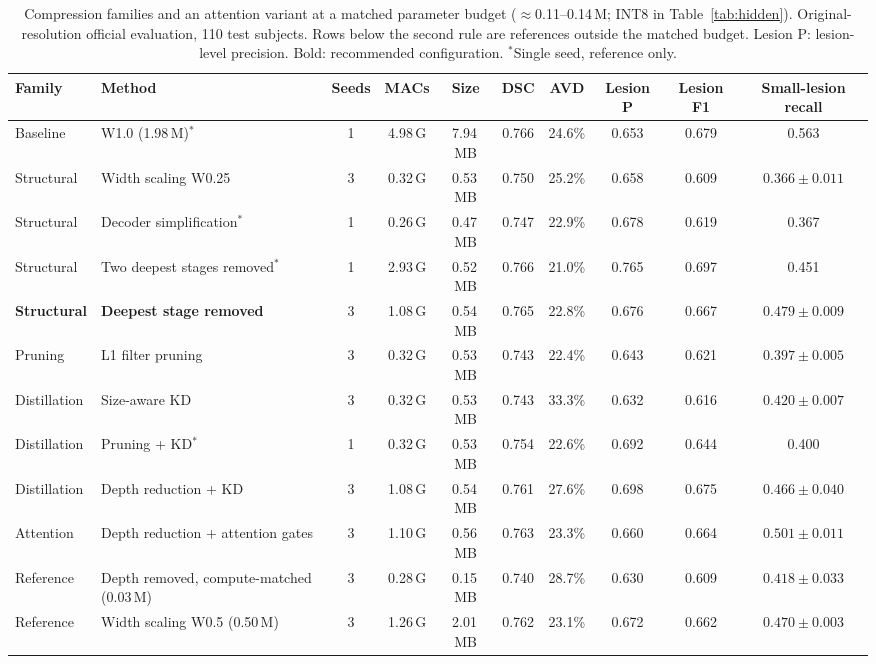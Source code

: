 \documentclass[conference]{IEEEtran}
\begin{document}
\begin{table}[t]
\caption{Compression families and an attention variant at a matched
parameter budget ($\approx$0.11--0.14\,M; INT8 in Table~\ref{tab:hidden}). Original-resolution official evaluation, 110 test
subjects. Rows below the second rule are references outside the matched
budget. Lesion P: lesion-level precision. Bold: recommended configuration. $^{*}$Single seed, reference only.}
\label{tab:main}
\centering
\footnotesize
\setlength{\tabcolsep}{4pt}
\begin{tabular}{llcccccccc}
\toprule
Family & Method & Seeds & MACs & Size & DSC & AVD & Lesion P & Lesion F1 & Small-lesion recall \\
\midrule
Baseline & W1.0 (1.98\,M)$^{*}$ & 1 & 4.98\,G & 7.94\,MB & 0.766 & 24.6\% & 0.653 & 0.679 & 0.563 \\
\midrule
Structural & Width scaling W0.25 & 3 & 0.32\,G & 0.53\,MB & 0.750 & 25.2\% & 0.658 & 0.609 & $0.366 \pm 0.011$ \\
Structural & Decoder simplification$^{*}$ & 1 & 0.26\,G & 0.47\,MB & 0.747 & 22.9\% & 0.678 & 0.619 & 0.367 \\
Structural & Two deepest stages removed$^{*}$ & 1 & 2.93\,G & 0.52\,MB & 0.766 & 21.0\% & 0.765 & 0.697 & 0.451 \\
\textbf{Structural} & \textbf{Deepest stage removed} & 3 & 1.08\,G & 0.54\,MB & 0.765 & 22.8\% & 0.676 & 0.667 & $0.479 \pm 0.009$ \\
Pruning & L1 filter pruning & 3 & 0.32\,G & 0.53\,MB & 0.743 & 22.4\% & 0.643 & 0.621 & $0.397 \pm 0.005$ \\
Distillation & Size-aware KD & 3 & 0.32\,G & 0.53\,MB & 0.743 & 33.3\% & 0.632 & 0.616 & $0.420 \pm 0.007$ \\
Distillation & Pruning + KD$^{*}$ & 1 & 0.32\,G & 0.53\,MB & 0.754 & 22.6\% & 0.692 & 0.644 & 0.400 \\
Distillation & Depth reduction + KD & 3 & 1.08\,G & 0.54\,MB & 0.761 & 27.6\% & 0.698 & 0.675 & $0.466 \pm 0.040$ \\
Attention & Depth reduction + attention gates & 3 & 1.10\,G & 0.56\,MB & 0.763 & 23.3\% & 0.660 & 0.664 & $0.501 \pm 0.011$ \\
\midrule
Reference & Depth removed, compute-matched (0.03\,M) & 3 & 0.28\,G & 0.15\,MB & 0.740 & 28.7\% & 0.630 & 0.609 & $0.418 \pm 0.033$ \\
Reference & Width scaling W0.5 (0.50\,M) & 3 & 1.26\,G & 2.01\,MB & 0.762 & 23.1\% & 0.672 & 0.662 & $0.470 \pm 0.003$ \\
\bottomrule
\end{tabular}
\end{table}
\end{document}
